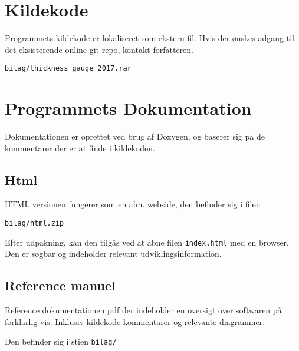 \appendix

\section{Kildekode}
Programmets kildekode er lokaliseret som ekstern fil.
Hvis der ønskes adgang til det eksisterende online git repo, kontakt forfatteren.

\texttt{bilag/thickness\_gauge\_2017.rar}

\section{Programmets Dokumentation}

Dokumentationen er oprettet ved brug af Doxygen, og baserer sig på de kommentarer der er at finde i kildekoden.

\subsection{Html}

HTML versionen fungerer som en alm. webside, den befinder sig i filen

\texttt{bilag/html.zip}

Efter udpakning, kan den tilgås ved at åbne filen \texttt{index.html} med en browser.
Den er søgbar og indeholder relevant udviklingsinformation.

\subsection{Reference manuel}

Reference dokumentationen pdf der indeholder en oversigt over softwaren på forklarlig vis. Inklusiv kildekode kommentarer og relevante diagrammer.

Den befinder sig i stien \texttt{bilag/}
